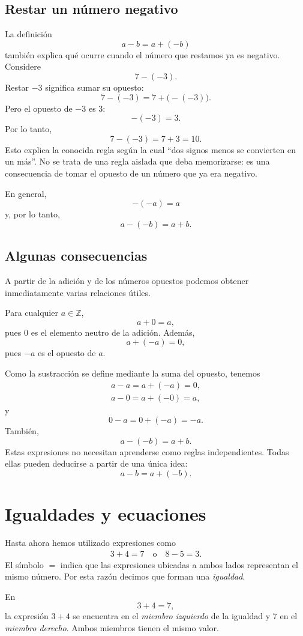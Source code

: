 \subsection{Restar un número negativo}

La definición
\[
a-b=a+(-b)
\]
también explica qué ocurre cuando el número que restamos ya es negativo.
Considere
\[
7-(-3).
\]
Restar \(-3\) significa sumar su opuesto:
\[
7-(-3)=7+\bigl(-(-3)\bigr).
\]
Pero el opuesto de \(-3\) es \(3\):
\[
-(-3)=3.
\]
Por lo tanto,
\[
7-(-3)=7+3=10.
\]
Esto explica la conocida regla según la cual ``dos signos menos se convierten en un más''. No se trata de una regla aislada que deba memorizarse: es una consecuencia de tomar el opuesto de un número que ya era negativo.

En general,
\[
-(-a)=a
\]
y, por lo tanto,
\[
a-(-b)=a+b.
\]

\subsection{Algunas consecuencias}

A partir de la adición y de los números opuestos podemos obtener inmediatamente varias relaciones útiles.

Para cualquier \(a\in\mathbb{Z}\),
\[
a+0=a,
\]
pues \(0\) es el elemento neutro de la adición.
Además,
\[
a+(-a)=0,
\]
pues \(-a\) es el opuesto de \(a\).

Como la sustracción se define mediante la suma del opuesto, tenemos
\begin{align*}
a-a=a+(-a)=0,\\
a-0=a+(-0)=a,
\end{align*}
y
\[
0-a=0+(-a)=-a.
\]
También,
\[
a-(-b)=a+b.
\]
Estas expresiones no necesitan aprenderse como reglas independientes. Todas ellas pueden deducirse a partir de una única idea:
\[
a-b=a+(-b).
\]

\section{Igualdades y ecuaciones}

Hasta ahora hemos utilizado expresiones como
\begin{gather*}
3+4=7 \quad
\text{o}\quad
8-5=3.
\end{gather*}
El símbolo \(=\) indica que las expresiones ubicadas a ambos lados representan el mismo número. Por esta razón decimos que forman una \emph{igualdad}.

En
\[
3+4=7,
\]
la expresión \(3+4\) se encuentra en el \emph{miembro izquierdo} de la igualdad y \(7\) en el \emph{miembro derecho}. Ambos miembros tienen el mismo valor.

